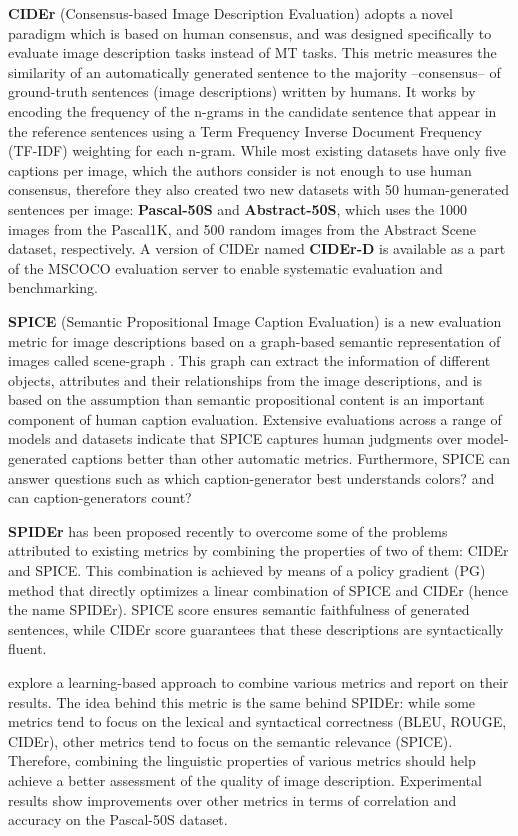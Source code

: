 \textbf{CIDEr} (Consensus-based Image Description Evaluation) \citep{Vedantam2015} adopts a novel paradigm which is based on human consensus, and was designed specifically to evaluate image description tasks instead of MT tasks. This metric measures the similarity of an automatically generated sentence to the majority --consensus-- of ground-truth sentences (image descriptions) written by humans. It works by encoding the frequency of the n-grams in the candidate sentence that appear in the reference sentences using a Term Frequency Inverse Document Frequency (TF-IDF) weighting for each n-gram. While most existing datasets have only five captions per image, which the authors consider is not enough to use human consensus, therefore they also created two new datasets with 50 human-generated sentences per image: \textbf{Pascal-50S} and \textbf{Abstract-50S}, which uses the 1000 images from the Pascal1K, and 500 random images from the Abstract Scene dataset, respectively. A version of CIDEr named \textbf{CIDEr-D} is available as a part of the MSCOCO evaluation server to enable systematic evaluation and benchmarking.

\textbf{SPICE} (Semantic Propositional Image Caption Evaluation) \citep{Anderson2016} is a new evaluation metric for image descriptions based on a graph-based semantic representation of images called scene-graph \citep{Johnson2015, Schuster2015}. This graph can extract the information of different objects, attributes and their relationships from the image descriptions, and is based on the assumption than semantic propositional content is an important component of human caption evaluation. Extensive evaluations across a range of models and datasets indicate that SPICE captures human judgments over model-generated captions better than other automatic metrics. Furthermore, SPICE can answer questions such as which caption-generator best understands colors? and can caption-generators count?

\textbf{SPIDEr} \cite{Liu2017b} has been proposed recently to overcome some of the problems attributed to existing metrics by combining the properties of two of them: CIDEr and SPICE. This combination is achieved by means of a policy gradient (PG) method that directly optimizes a linear combination of SPICE and CIDEr (hence the name SPIDEr). SPICE score ensures semantic faithfulness of generated sentences, while CIDEr score guarantees that these descriptions are syntactically fluent.

\citep{Sharif2018} explore a learning-based approach to combine various metrics and report on their results. The idea behind this metric is the same behind SPIDEr: while some metrics tend to focus on the lexical and syntactical correctness (BLEU, ROUGE, CIDEr), other metrics tend to focus on the semantic relevance (SPICE). Therefore, combining the linguistic properties of various metrics should help achieve a better assessment of the quality of image description. Experimental results show improvements over other metrics in terms of correlation and accuracy on the Pascal-50S dataset.


